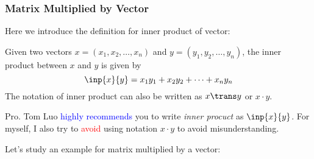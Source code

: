 \subsubsection{Matrix Multiplied by Vector}
Here we introduce the definition for inner product of vector:
\begin{definition}
Given two vectors $x = (x_1,x_2,\dots,x_n)$ and $y = (y_1,y_2,\dots,y_n)$, the inner product between $x$ and $y$ is given by 
\begin{equation*}
\inp{x}{y} = x_1y_1 + x_2y_2 + \dots + x_ny_n
\end{equation*}
The notation of inner product can also be written as $x\trans y$ or $x \cdot y$.
\end{definition}
\begin{remark}
Pro. Tom Luo \textcolor{blue}{highly recommends} you to write \textit{inner procuct} as $
\inp{x}{y}$. For myself, I also try to \textcolor{red}{avoid} using notation $x \cdot y$ to avoid misunderstanding.
\end{remark}
Let's study an example for matrix multiplied by a vector:
